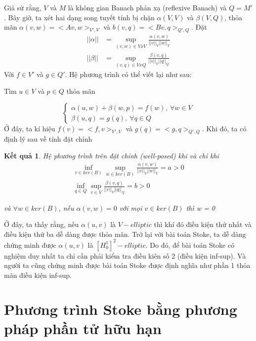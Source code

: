 \documentclass[14pt]{extreport}
\newtheorem{theorem}{\MakeUppercase{K}ết quả}[section]
\begin{document}
{Giả sử rằng, $V$ và $M$ là không gian Banach phản xạ (reflexive Banach) và $Q = M'$. Bây giờ, ta xét hai dạng song tuyết tính bị chặn $\alpha(V, V)$ và $\beta(V, Q)$, thỏa mãn $\alpha(v, w) =  <Av, w>_{V', V}$ và $b(v, q) = <Bv, q>_{Q', Q}$. Đặt
\begin{equation} \label{eq8}
\begin{split}
||\alpha|| & = \sup_{(v, w) \in V x V} \frac{\alpha(v,w)}{||v||_V||w||_V} \\
||\beta|| & = \sup_{(v, q) \in V x Q} \frac{\beta(v,q)}{||v||_V||q||_Q}
\end{split}
\end{equation}
Với $f \in V'$ và $g \in Q'$. Hệ phương trình có thể viết lại như sau:
\begin{center}
Tìm $u \in V$  và $p \in Q$  thỏa mãn
\end{center}
$$
\begin{cases}
\alpha(u, w) + \beta(w,p) = f(w), \ \forall w \in V \\
\beta(u,q) = g(q), \ \forall q \in Q
\end{cases}
$$
Ở đây, ta kí hiệu $f(v) = <f, v>_{V', V}$ và $g(q) = <g,q>_{Q', Q}$.
Khi đó, ta có định lý sau về tính đặt chỉnh
\begin{theorem}
Hệ phương trình trên đặt chỉnh (well-posed) khi và chỉ khi
\begin{equation} \label{eq8}
\begin{split}
\inf_{v \in ker(B)} \sup_{w \in ker(B)} \frac{\alpha(v,w)}{||v||_V||w||_V} = a > 0 \\
\inf_{q \in Q} \sup_{v \in V} \frac{\beta(v, q)}{||v||_V||q||_Q} = b > 0
\end{split}
\end{equation}
\begin{center}
và $\forall w \in ker(B)$, nếu $\alpha(v, w) = 0$ với mọi $v \in ker(B)$ thì w = 0
\end{center}
\end{theorem}
\newpage
Ở đây, ta thấy rằng, nếu $\alpha(u, v)$ là $V-elliptic$ thì khí đó điều kiện thứ nhất và điều kiện thứ ba dễ dàng được thỏa mãn. Trở lại với bài toán Stoke, ta dễ dàng chứng minh được $\alpha(u, v)$ là $[H_0^1]^2 - elliptic$. Do đó, để bài toán Stoke có nghiệm duy nhất ta chỉ cần phải kiểm tra điều kiên số 2 (điều kiện inf-sup). Và người ta cũng chứng minh được bài toán Stoke được định nghĩa như phần 1 thỏa mãn điều kiện inf-sup.
\chapter{Phương trình Stoke bằng phương pháp phần tử hữu hạn}
}
\end{document}
